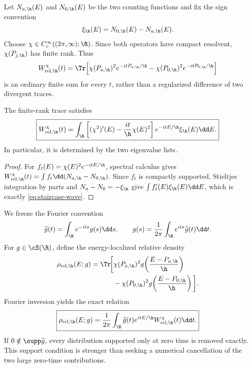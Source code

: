 Let \(N_{a,\h}(E)\) and \(N_{0,\h}(E)\) be the two counting functions and
fix the sign convention
\begin{equation}
 \xi_\h(E)=N_{0,\h}(E)-N_{a,\h}(E).
 \label{eq:relative-staircase}
\end{equation}
Choose \(\chi\in C_c^\infty((2\pi,\infty);\R)\).  Since both operators have
compact resolvent, \(\chi(P_{j,\h})\) has finite rank.  Thus
\begin{equation}
 W_{\mathrm{rel},\h}^{\chi}(t)
 =\Tr\!\left[
 \chi(P_{a,\h})^2e^{-itP_{a,\h}/\h}
 -\chi(P_{0,\h})^2e^{-itP_{0,\h}/\h}
 \right]
 \label{eq:relative-wave}
\end{equation}
is an ordinary finite sum for every \(t\), rather than a regularized
difference of two divergent traces.

\begin{proposition}
\label{prop:staircase-identity}
The finite-rank trace satisfies
\begin{equation}
 \boxed{
 W_{\mathrm{rel},\h}^{\chi}(t)
 =\int_\R
 \left[(\chi^2)'(E)-\frac{it}{\h}\chi(E)^2\right]
 e^{-itE/\h}\xi_\h(E)\dd E.}
 \label{eq:staircase-wave}
\end{equation}
In particular, it is determined by the two eigenvalue lists.
\end{proposition}

\begin{proof}
For \(f_t(E)=\chi(E)^2e^{-itE/\h}\), spectral calculus gives
\(W_{\mathrm{rel},\h}^{\chi}(t)=\int f_t\dd(N_{a,\h}-N_{0,\h})\).
Since \(f_t\) is compactly supported, Stieltjes integration by parts and
\(N_a-N_0=-\xi_\h\) give \(\int f_t'(E)\xi_\h(E)\dd E\), which is exactly
\cref{eq:staircase-wave}.
\end{proof}

We freeze the Fourier convention
\begin{equation}
 \widehat g(t)=\int_\R e^{-its}g(s)\dd s,
 \qquad
 g(s)=\frac{1}{2\pi}\int_\R e^{its}\widehat g(t)\dd t.
 \label{eq:fourier-convention}
\end{equation}
For \(g\in\cS(\R)\), define the energy-localized relative density
\begin{align}
 \rho_{\mathrm{rel},\h}(E;g)
 =\Tr\!\bigg[&\chi(P_{a,\h})^2
 g\!\left(\frac{E-P_{a,\h}}{\h}\right)\notag\\
 &-\chi(P_{0,\h})^2
 g\!\left(\frac{E-P_{0,\h}}{\h}\right)\bigg].
 \label{eq:relative-density}
\end{align}
Fourier inversion yields the exact relation
\begin{equation}
 \boxed{
 \rho_{\mathrm{rel},\h}(E;g)
 =\frac{1}{2\pi}\int_\R
 \widehat g(t)e^{itE/\h}W_{\mathrm{rel},\h}^{\chi}(t)\dd t.}
 \label{eq:density-wave}
\end{equation}
If \(0\notin\supp\widehat g\), every distribution supported only at zero
time is removed exactly.  This support condition is stronger than seeking a
numerical cancellation of the two large zero-time contributions.

